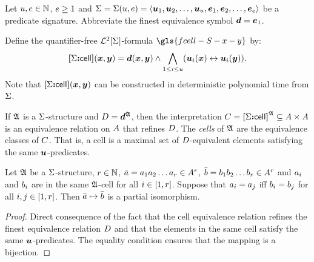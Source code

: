 
Let $u, e \in \mathbb{N}$, $e \geq 1$ and $\mathrm{\Sigma} = \mathrm{\Sigma}(u,e) =
\left\langle \bm{u}_{1},\bm{u}_{2},\dots,\bm{u}_{u},\bm{e}_{1},\bm{e}_{2},\dots,\bm{e}_{e} \right\rangle$
be a predicate signature.
Abbreviate the finest equivalence symbol $\bm{d} = \bm{e}_{1}$.

\begin{definition}
Define the quantifier-free $\mathcal{L}^{2}[\mathrm{\Sigma}]$-formula $\gls{fcell-S-x-y}$ by:
\[
  {\bm{[}\mathrm{\Sigma}\mathord{\bm{:}}\mathsf{cell}\bm{]}}(\bm{x},\bm{y}) = \bm{d}(\bm{x},\bm{y}) \land
  \bigwedge_{1 \leq i \leq u} (\bm{u}_{i}(\bm{x}) \leftrightarrow \bm{u}_{i}(\bm{y})).
\]
Note that ${\bm{[}\mathrm{\Sigma}\mathord{\bm{:}}\mathsf{cell}\bm{]}}(\bm{x},\bm{y})$ can be constructed in deterministic polynomial
time from $\mathrm{\Sigma}$.

If $\mathfrak{A}$ is a $\mathrm{\Sigma}$-structure and $D = \bm{d}^{\mathfrak{A}}$,
then the interpretation $C = {\bm{[}\mathrm{\Sigma}\mathord{\bm{:}}\mathsf{cell}\bm{]}}^{\mathfrak{A}} \subseteq {A\times A}$ is an
equivalence relation on $A$ that refines $D$.
The \emph{cells} of $\mathfrak{A}$ are the equivalence classes of $C$.
That is, a cell is a maximal set of $D$-equivalent elements satisfying the
same $\bm{u}$-predicates.
\end{definition}

\begin{remark}\label{rem:monadic-same-cell-r}
Let $\mathfrak{A}$ be a $\mathrm{\Sigma}$-structure, $r \in \mathbb{N}$,
$\bar{a} = a_{1}a_{2}\dots a_{r} \in A^r$,
$\bar{b} = b_{1}b_{2}\dots b_{r} \in A^r$ and $a_{i}$ and $b_{i}$
are in the same $\mathfrak{A}$-cell for all $i \in [1,r]$.
Suppose that $a_{i} = a_{j}$ iff $b_{i} = b_{j}$ for all $i, j \in
[1,r]$.
Then $\bar{a} \mapsto \bar{b}$ is a partial isomorphism.
\end{remark}
\begin{proof}
Direct consequence of the fact that the cell equivalence relation refines the
finest equivalence relation $D$ and that the elements in the same cell
satisfy the same $\bm{u}$-predicates.
The equality condition ensures that the mapping is a bijection.
\end{proof}

